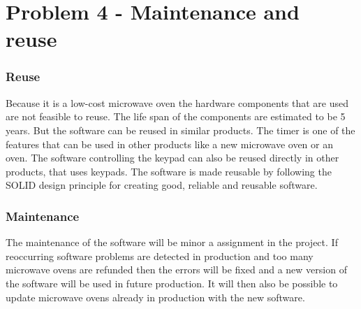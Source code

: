 \chapter{Problem 4 - Maintenance and reuse}
\subsection{Reuse}
Because it is a low-cost microwave oven the hardware components that are used are not feasible to reuse. The life span of the components are estimated to be 5 years. But the software can be reused in similar products. The timer is one of the features that can be used in other products like a new microwave oven or an oven. The software controlling the keypad can also be reused directly in other products, that uses keypads. 
The software is made reusable by following the SOLID design  principle for creating good, reliable and reusable software.  


\subsection{Maintenance}
The maintenance of the software will be minor a assignment in the project. If reoccurring software problems are detected in production and too many microwave ovens are refunded then the errors will be fixed and a new version of the software will be used in future production. It will then also be possible to update microwave ovens already in production with the new software.